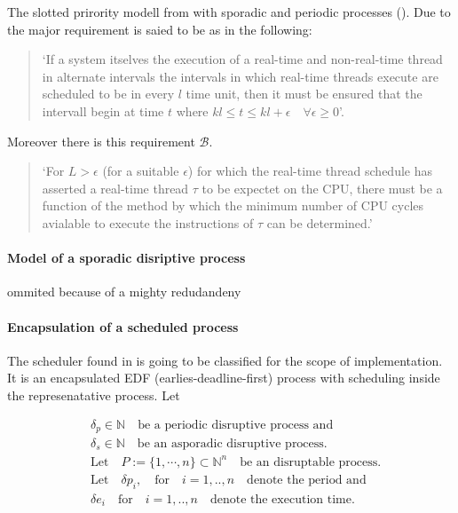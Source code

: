The slotted prirority modell from \cite{B} with  sporadic and periodic processes (\cite{K}).
Due to \cite{B} the major requirement is saied to be as in the following:

\begin{quote}
	`If a system itselves the execution of a real-time and non-real-time thread in alternate intervals the intervals in which real-time threads execute are scheduled to be in every $l$ time unit, then it must be ensured that the intervall begin at time $t$ where $kl \leq t \leq kl+\epsilon \quad \forall
 \epsilon \geq 0$'.
\end{quote}

Moreover there is this requirement $\mathcal{B}$.
\begin{quote}
`For $L>\epsilon$ (for a suitable $\epsilon$) for which the real-time thread schedule has asserted a real-time thread $\tau$ to be expectet on the CPU, there must be a function of the method by which the minimum number of CPU cycles avialable to execute the instructions of $\tau$ can be determined.'
\end{quote}

\paragraph{Model of a sporadic disriptive process}
ommited because of a mighty redudandeny

\paragraph*{Encapsulation of a scheduled process}
 
The scheduler found  in \cite{K} is going to be classified for the scope of implementation. It is an encapsulated EDF (earlies-deadline-first) process with scheduling inside the represenatative process. Let
      
\begin{align}
 & \delta_p \in \mathbb{N} \quad \text{be a periodic disruptive process and}\\
 	&\delta_s \in  \mathbb{N} \quad \text{be an asporadic disruptive process.}\\
	 &\text{Let} \quad P := \{1, \cdots, n \} \subset \mathbb{N}^n \quad \text{be an disruptable process.}  \\
 	&\text{Let} \quad  \delta p_i, \quad \text{for} \quad i = 1,..,n \quad  \text{denote the period and}  \\
 	&\delta e_i \quad \text{for} \quad  i = 1,..,n \quad  \text{denote the execution time}.  
\end{align}   

